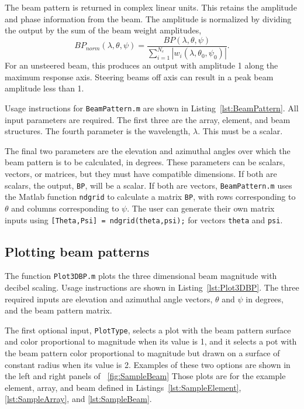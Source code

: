 The beam pattern is returned in complex linear units. This retains the amplitude and phase information from the beam. The amplitude is normalized by dividing the output by the sum of the beam weight amplitudes,
\begin{equation}
BP_{norm}(\lambda,\theta,\psi) = \frac{BP(\lambda,\theta,\psi)}{\sum_{i=1}^{N_e}|w_i(\lambda,\theta_0,\psi_0)|}.
\end{equation}
For an unsteered beam, this produces an output with amplitude 1 along the maximum response axis. Steering beams off axis can result in a peak beam amplitude less than 1.

Usage instructions for \texttt{BeamPattern.m} are shown in Listing~\ref{lst:BeamPattern}. All input parameters are required. The first three are the array, element, and beam structures. The fourth parameter is the wavelength, $\lambda$. This must be a scalar. 

The final two parameters are the elevation and azimuthal angles over which the beam pattern is to be calculated, in degrees. These parameters can be scalars, vectors, or matrices, but they must have compatible dimensions. If both are scalars, the output, \texttt{BP}, will be a scalar. If both are vectors, \texttt{BeamPattern.m} uses the Matlab function \texttt{ndgrid} to calculate a matrix \texttt{BP}, with rows corresponding to $\theta$ and columns corresponding to $\psi$. The user can generate their own matrix inputs using \texttt{[Theta,Psi] = ndgrid(theta,psi);} for vectors \texttt{theta} and \texttt{psi}.



\subsection{Plotting beam patterns}

The function \texttt{Plot3DBP.m} plots the three dimensional beam magnitude with decibel scaling. Usage instructions are shown in Listing~\ref{lst:Plot3DBP}. The three required inputs are elevation and azimuthal angle vectors, $\theta$ and $\psi$ in degrees, and the beam pattern matrix. 

The first optional input, \texttt{PlotType}, selects a plot with the beam pattern surface and color proportional to magnitude when its value is 1, and it selects a pot with the beam pattern color proportional to magnitude but drawn on a surface of constant radius when its value is 2. Examples of these two options are shown in the left and right panels of \figname~\ref{fig:SampleBeam} Those plots are for the example element, array, and beam defined in Listings~\ref{lst:SampleElement}, \ref{lst:SampleArray}, and \ref{lst:SampleBeam}.

